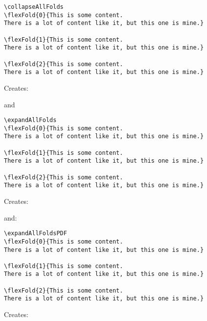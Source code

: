 \documentclass{ximera}
\begin{document}
\begin{verbatim}
\collapseAllFolds
\flexFold{0}{This is some content. 
There is a lot of content like it, but this one is mine.}

\flexFold{1}{This is some content. 
There is a lot of content like it, but this one is mine.}

\flexFold{2}{This is some content. 
There is a lot of content like it, but this one is mine.}
\end{verbatim}

Creates:
\collapseAllFolds
{}



and 
\begin{verbatim}
\expandAllFolds
\flexFold{0}{This is some content. 
There is a lot of content like it, but this one is mine.}

\flexFold{1}{This is some content. 
There is a lot of content like it, but this one is mine.}

\flexFold{2}{This is some content. 
There is a lot of content like it, but this one is mine.}
\end{verbatim}

Creates:
\expandAllFolds
{}



and:

\begin{verbatim}
\expandAllFoldsPDF
\flexFold{0}{This is some content. 
There is a lot of content like it, but this one is mine.}

\flexFold{1}{This is some content. 
There is a lot of content like it, but this one is mine.}

\flexFold{2}{This is some content. 
There is a lot of content like it, but this one is mine.}
\end{verbatim}

Creates:
\expandAllFoldsPDF
{}


\end{document}
